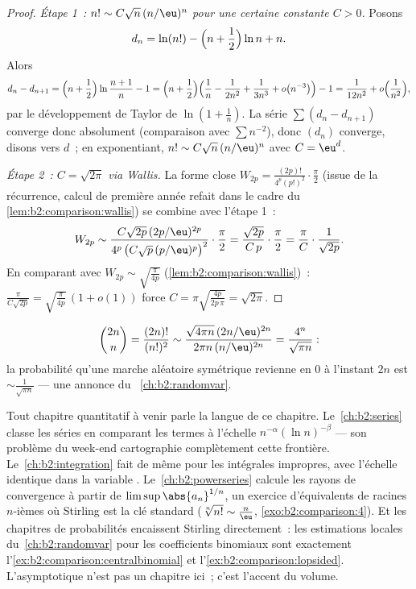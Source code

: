 \begin{proof}
\emph{Étape 1~: $n! \sim C \sqrt n\, (n/\eu)^n$ pour une certaine
constante $C > 0$.} Posons
\[
d_n = \ln(n!) - \Bigl(n + \frac12\Bigr)\ln n + n .
\]
Alors
\[
d_n - d_{n+1}
= \Bigl(n + \frac12\Bigr) \ln\frac{n+1}{n} - 1
= \Bigl(n + \frac12\Bigr)\Bigl(\frac1n - \frac{1}{2n^2} +
\frac{1}{3n^3} + o\bigl(n^{-3}\bigr)\Bigr) - 1
= \frac{1}{12n^2} + o\Bigl(\frac{1}{n^2}\Bigr),
\]
par le développement de Taylor de $\ln(1 + \frac1n)$. La série $\sum
(d_n - d_{n+1})$ converge donc absolument (comparaison avec $\sum
n^{-2}$), donc $(d_n)$ converge, disons vers $d$~; en exponentiant,
$n! \sim C\sqrt n\,(n/\eu)^n$ avec $C = \eu^{d}$.

\emph{Étape 2~: $C = \sqrt{2\pi}$ via Wallis.} La forme close $W_{2p}
= \frac{(2p)!}{4^p (p!)^2}\cdot\frac\pi2$ (issue de la récurrence,
calcul de première année refait dans le cadre du~%
\cref{lem:b2:comparison:wallis}) se combine avec l'étape 1~:
\[
W_{2p} \sim \frac{C\sqrt{2p}\,(2p/\eu)^{2p}}
{4^p\,\bigl(C\sqrt p\,(p/\eu)^p\bigr)^2}\cdot\frac{\pi}{2}
= \frac{\sqrt{2p}}{C\,p}\cdot\frac{\pi}{2}
= \frac{\pi}{C}\cdot\frac{1}{\sqrt{2p}} .
\]
En comparant avec $W_{2p} \sim \sqrt{\frac{\pi}{4p}}$
(\cref{lem:b2:comparison:wallis})~: $\frac{\pi}{C\sqrt{2p}} =
\sqrt{\frac{\pi}{4p}}\,(1 + o(1))$ force $C = \pi
\sqrt{\frac{4p}{2p\,\pi}} = \sqrt{2\pi}$.
\end{proof}

\begin{example}\label{ex:b2:comparison:centralbinomial}
\[
\binom{2n}{n} = \frac{(2n)!}{(n!)^2}
\sim \frac{\sqrt{4\pi n}\,(2n/\eu)^{2n}}{2\pi n\,(n/\eu)^{2n}}
= \frac{4^n}{\sqrt{\pi n}} :
\]
la probabilité qu'une marche aléatoire symétrique revienne en $0$ à
l'instant $2n$ est $\sim \frac{1}{\sqrt{\pi n}}$ --- une annonce du~%
\cref{ch:b2:randomvar}.
\end{example}

\begin{remark}\label{rem:b2:comparison:perspectives}
Tout chapitre quantitatif à venir parle la langue de ce chapitre.
Le~\cref{ch:b2:series} classe les séries en comparant les termes à
l'échelle $n^{-\alpha}(\ln n)^{-\beta}$ --- son problème du week-end
cartographie complètement cette frontière.
Le~\cref{ch:b2:integration} fait de même pour les intégrales
impropres, avec l'échelle identique dans la variable .
Le~\cref{ch:b2:powerseries} calcule les rayons de convergence à partir
de $\limsup\abs{a_n}^{1/n}$, un exercice d'équivalents de racines
$n$-ièmes où Stirling est la clé standard ($\sqrt[n]{n!}
\sim \frac n\eu$, \cref{exo:b2:comparison:4}). Et les chapitres de
probabilités encaissent Stirling directement~: les estimations
locales du~\cref{ch:b2:randomvar} pour les coefficients binomiaux
sont exactement l'\cref{ex:b2:comparison:centralbinomial} et
l'\cref{ex:b2:comparison:lopsided}. L'asymptotique n'est pas
un chapitre ici~; c'est l'accent du volume.
\end{remark}

